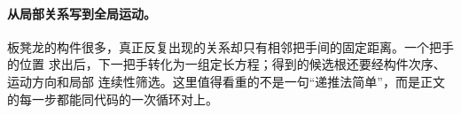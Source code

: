 \paragraph{从局部关系写到全局运动。}
板凳龙的构件很多，真正反复出现的关系却只有相邻把手间的固定距离。一个把手的位置
求出后，下一把手转化为一组定长方程；得到的候选根还要经构件次序、运动方向和局部
连续性筛选。这里值得看重的不是一句“递推法简单”，而是正文的每一步都能同代码的一次循环对上。

